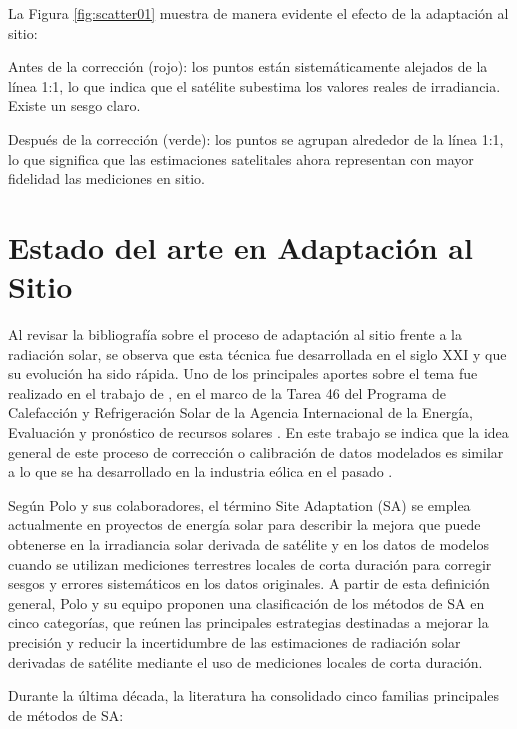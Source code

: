 \documentclass[letterpaper,12pt, twoside]{report}
\providecommand{\DIFdeltex}[1]{{\protect\color{red} \scriptsize #1}} %
\providecommand{\DIFdel}[1]{\texorpdfstring{\DIFdeltex{#1}}{}} %
\begin{document}
\DIFdel{La Figura \ref{fig:scatter01} muestra de manera evidente el efecto de la adaptación al sitio:
}%

\DIFdel{Antes de la corrección (rojo): los puntos están sistemáticamente alejados de la línea 1:1, lo que indica que el satélite subestima los valores reales de irradiancia. Existe un sesgo claro.
}%

\DIFdel{Después de la corrección (verde): los puntos se agrupan alrededor de la línea 1:1, lo que significa que las estimaciones satelitales ahora representan con mayor fidelidad las mediciones en sitio.
}%

\section{\DIFdel{Estado del arte en Adaptación al Sitio}}
\addtocounter{section}{-1}%
\DIFdel{Al revisar la bibliografía sobre el proceso de adaptación al sitio frente a la radiación solar, se observa que esta técnica fue desarrollada en el siglo XXI y que su evolución ha sido rápida. Uno de los principales aportes sobre el tema fue realizado en el trabajo de \cite{POLO2016}, en el marco de la Tarea 46 del Programa de Calefacción y Refrigeración Solar de la Agencia Internacional de la Energía, Evaluación y pronóstico de recursos solares \citep{Task46}. En este trabajo se indica que la idea general de este proceso de corrección o calibración de datos modelados es similar a lo que se ha desarrollado en la industria eólica en el pasado \citep{Potter}.
}%

\DIFdel{Según Polo y sus colaboradores, el término Site Adaptation (SA) se emplea actualmente en proyectos de energía solar para describir la mejora que puede obtenerse en la irradiancia solar derivada de satélite y en los datos de modelos cuando se utilizan mediciones terrestres locales de corta duración para corregir sesgos y errores sistemáticos en los datos originales. A partir de esta definición general, Polo y su equipo proponen una clasificación de los métodos de SA en cinco categorías, que reúnen las principales estrategias destinadas a mejorar la precisión y reducir la incertidumbre de las estimaciones de radiación solar derivadas de satélite mediante el uso de mediciones locales de corta duración.
}%

\DIFdel{Durante la última década, la literatura ha consolidado cinco familias principales de métodos de SA:
}%
\end{document}

